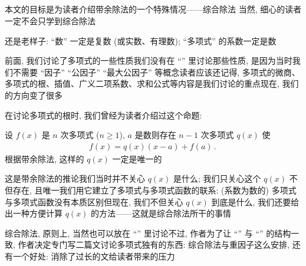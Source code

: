 \subsection*{\SyntheticDivision}
\markright{\SyntheticDivision}

本文的目标是为读者介绍带余除法的一个特殊情况——综合除法 \period 当然, 细心的读者一定不会只学到综合除法\period

还是老样子: ``数'' 一定是复数 (或实数、有理数); ``多项式'' 的系数一定是数\period

前面, 我们讨论了多项式的一些性质\period 我们没有在 ``\HEADING '' 里讨论那些性质, 是因为当时我们不需要 ``因子'' ``公因子'' ``最大公因子'' 等概念\period 读者应该还记得, 多项式的微商、多项式的根、插值、广义二项系数、求和公式等内容是我们讨论的重点\period 现在, 我们的方向变了很多\period

在讨论多项式的根时, 我们曾经为读者介绍过这个命题:
\begin{proposition}
    设 $f(x)$ 是 $n$ 次多项式 ($n \geq 1$), $a$ 是数\period 则存在 $n-1$ 次多项式 $q(x)$ 使
    \begin{align*}
        f(x) = q(x) (x-a) + f(a) \period
    \end{align*}
    根据带余除法, 这样的 $q(x)$ 一定是唯一的\period
\end{proposition}

这是带余除法的推论\period 我们当时并不关心 $q(x)$ 是什么; 我们只关心这个 $q(x)$ 不但存在, 且唯一\period 我们用它建立了多项式与多项式函数的联系: (系数为数的) 多项式与多项式函数没有本质区别\period 但现在, 我们不但关心 $q(x)$ 到底是什么, 我们还要给出一种方便计算 $q(x)$ 的方法——这就是综合除法所干的事情\period

综合除法, 原则上, 当然也可以放在 ``\SomePropertiesOfPolynomials '' 里讨论\period 不过, 作者为了让 ``\SomePropertiesOfIntegers '' 与 ``\SomePropertiesOfPolynomials '' 的结构一致, 作者决定专门写二篇文讨论多项式独有的东西: 综合除法与重因子\period 这么安排, 还有一个好处: 消除了过长的文给读者带来的压力\period

